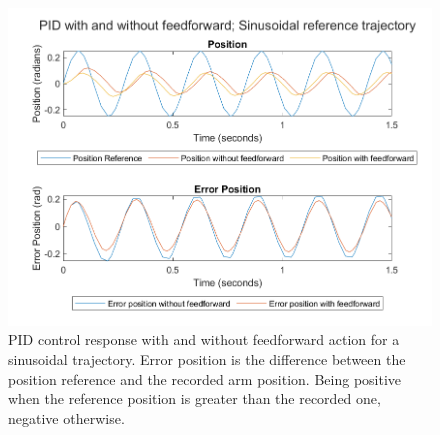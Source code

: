 \begin{figure}[h]
    \centering
    \includegraphics[width=.7\textwidth]{PIDfeedforward_sinusoidal.png}
    \caption{PID control response with and without feedforward action for a sinusoidal trajectory. Error position is the difference between the position reference and the recorded arm position. Being positive when the reference position is greater than the recorded one, negative otherwise.}
    \label{fig:PIDfeedforward_sinusoidal}
\end{figure}